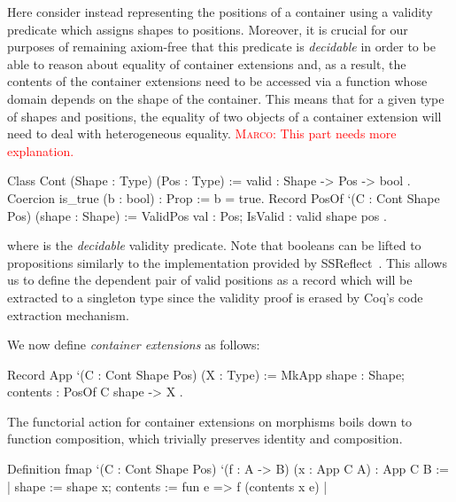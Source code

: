 \documentclass[anonymous, a4paper, UKenglish, cleveref, autoref, thm-restate]{lipics-v2021}
\newcommand{\mpav}[1]{\textcolor{red}{\textsc{Marco}: #1}}
\begin{document}
Here consider instead representing the positions of a container using a validity
predicate  which assigns shapes to positions.
Moreover, it is crucial for our purposes of remaining axiom-free that this
predicate is \emph{decidable} in order to be able to reason about equality of
container extensions and, as a result, the contents of the container extensions
need to be accessed via a function  whose domain depends on the
shape of the container.  This means that for a given type of shapes and
positions, the equality of two objects of a container extension will need to
deal with heterogeneous equality.
\mpav{This part needs more explanation.}

\begin{coqcode}
Class Cont (Shape : Type) (Pos : Type) := { valid : Shape -> Pos -> bool }.
Coercion is_true (b : bool) : Prop := b = true.
Record PosOf `(C : Cont Shape Pos) (shape : Shape) :=
  ValidPos { val : Pos; IsValid : valid shape pos }.
\end{coqcode}
where  is the \emph{decidable} validity predicate. Note that booleans
can be lifted to propositions similarly to the implementation provided by
SSReflect~\cite{GonthierL09}. This allows us to define the dependent pair of
valid positions as a record which will be extracted to a singleton type since
the validity proof is erased by Coq's code extraction mechanism.

We now define \emph{container extensions} as follows:
\begin{coqcode}
Record App `(C : Cont Shape Pos) (X : Type) :=
  MkApp { shape : Shape; contents : PosOf C shape -> X }.
\end{coqcode}
The functorial action for container extensions on morphisms boils down to
function composition, which trivially preserves identity and composition.
\begin{coqcode}
Definition fmap `(C : Cont Shape Pos) `(f : A -> B) (x : App C A) : App C B
  := {| shape := shape x; contents := fun e => f (contents x e) |}
\end{coqcode}


\end{document}
